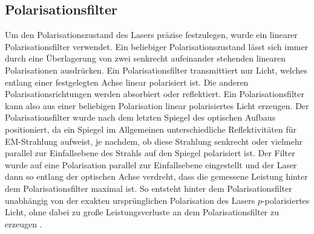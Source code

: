 \documentclass[a4paper, titlepage,  ngerman]{book}
\begin{document}
	\subsection{Polarisationsfilter}	
	Um den Polarisationszustand des Lasers präzise festzulegen, wurde ein linearer Polarisationsfilter verwendet. Ein beliebiger Polarisationszustand lässt sich immer durch eine Überlagerung von zwei senkrecht aufeinander stehenden linearen Polarisationen ausdrücken. Ein Polarisationsfilter transmittiert nur Licht, welches entlang einer festgelegten Achse linear polarisiert ist. Die anderen Polarisationsrichtungen werden absorbiert oder reflektiert. Ein Polarisationsfilter kann also aus einer beliebigen Polarisation linear polarisiertes Licht erzeugen. Der  Polarisationsfilter wurde nach dem letzten Spiegel des optischen Aufbaus positioniert, da ein Spiegel im Allgemeinen unterschiedliche Reflektivitäten für EM-Strahlung aufweist, je nachdem, ob diese Strahlung senkrecht oder vielmehr parallel zur Einfallsebene des Strahls auf den Spiegel polarisiert ist. Der Filter wurde auf eine Polarisation parallel zur Einfallsebene eingestellt und der Laser dann so entlang der optischen Achse verdreht, dass die gemessene Leistung hinter dem Polarisationsfilter maximal ist. So entsteht hinter dem Polarisationsfilter unabhängig  von der exakten ursprünglichen Polarisation des Lasers $p$-polarisiertes Licht, ohne dabei zu große Leistungsverluste an dem Polarisationsfilter zu erzeugen \cite{Hecht.2018}.
\end{document}
